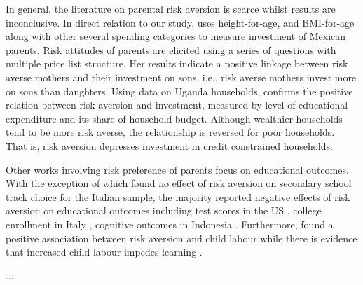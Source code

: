 \documentclass[]{article}
\begin{document}
In general, the literature on parental risk aversion is scarce whilst results are inconclusive. In direct relation to our study, \citet{sovero2018risk} uses height-for-age, and BMI-for-age along with other several spending categories to measure investment of Mexican parents. Risk attitudes of parents are elicited using a series of questions with multiple price list structure. Her results indicate a positive linkage between risk averse mothers and their investment on sons, i.e., risk averse mothers invest more on sons than daughters. Using data on Uganda households, \citet{tabetando2019parental} confirms the positive relation between risk aversion and investment, measured by level of educational expenditure and its share of household budget. Although wealthier households tend to be more risk averse, the relationship is reversed for poor households. That is, risk aversion depresses investment in credit constrained households.      

Other works involving risk preference of parents focus on educational outcomes. With the exception of \citet{leonardi2007parents} which found no effect of risk aversion on secondary school track choice for the Italian sample, the majority reported negative effects of risk aversion on educational outcomes including test scores in the US \citep{brown2012parental}, college enrollment in Italy \citep{checchi2014parents}, cognitive outcomes in Indonesia \citep{hartarto2023parental}. Furthermore, \citet{frempong2021risk} found a positive association between risk aversion and child labour while there is evidence that increased child labour impedes learning \citep{HEADY2003385, bezerra2009impact}.  

...

\end{document}
